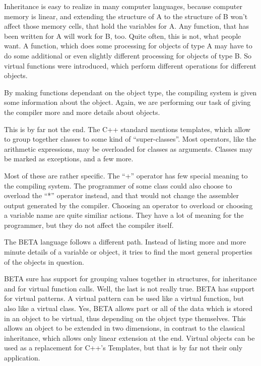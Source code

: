 Inheritance is easy to realize in many computer languages, because
computer memory is linear, and extending the structure of A
to the structure of B won't affect those memory cells, that
hold the variables for A.  Any function, that has been
written for A will work for B, too.
Quite often, this is not, what people want.  A function, which
does some processing for objects of type A may have to do
some additional or even slightly different processing for
objects of type B.  So virtual functions were introduced,
which perform different operations for different objects.

By making functions dependant on the object type, the
compiling system is given some information about the object.
Again, we are performing our task of giving the compiler more
and more details about objects.

This is by far not the end.  The C++ standard mentions
templates, which allow to group together classes to some kind
of ``super-classes''.  Most operators, like the arithmetic
expressions, may be overloaded for classes as arguments.
Classes may be marked as exceptions, and a few more.

Most of these are rather specific.  The ``+'' operator has few
special meaning to the compiling system.  The programmer of
some class could also choose to overload the ``*'' operator
instead, and that would not change the assembler output
generated by the compiler.  Choosing an operator to overload
or choosing a variable name are quite similiar actions.  They
have a lot of meaning for the programmer, but they do not
affect the compiler itself.

The BETA language follows a different path.  Instead of listing
more and more minute details of a variable or object, it tries
to find the most general properties of the objects in question.

BETA sure has support for grouping values together in structures,
for inheritance and for virtual function calls.  Well, the last
is not really true.  BETA has support for virtual patterns.  A
virtual pattern can be used like a virtual function, but also
like a virtual class.  Yes, BETA allows part or all of the data
which is stored in an object to be virtual, thus depending on the
object type themselves.  This allows an object to be extended in
two dimensions, in contrast to the classical inheritance, which
allows only linear extension at the end.  Virtual objects can be
used as a replacement for C++'s Templates, but that is by far
not their only application.

